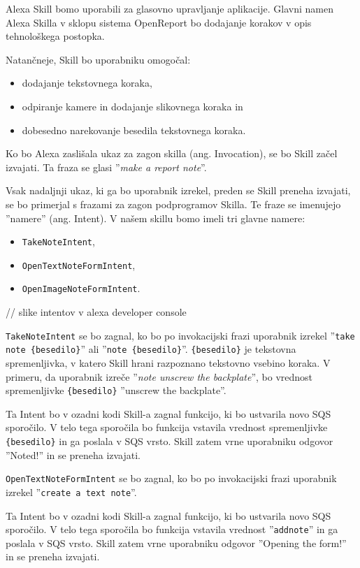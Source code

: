 \documentclass[a4paper, 12pt]{book}
\begin{document}
Alexa Skill bomo uporabili za glasovno upravljanje aplikacije.
Glavni namen Alexa Skilla v sklopu sistema OpenReport bo dodajanje korakov v opis tehnološkega postopka.

\noindent Natančneje, Skill bo uporabniku omogočal:
\begin{itemize}
	\item dodajanje tekstovnega koraka,
	\item odpiranje kamere in dodajanje slikovnega koraka in
	\item dobesedno narekovanje besedila tekstovnega koraka.
\end{itemize}

Ko bo Alexa zaslišala ukaz za zagon skilla (ang. Invocation), se bo Skill začel izvajati.
Ta fraza se glasi ''\textit{make a report note}''.

Vsak nadaljnji ukaz, ki ga bo uporabnik izrekel, preden se Skill preneha izvajati, se bo primerjal s frazami za zagon podprogramov Skilla.
Te fraze se imenujejo ''namere'' (ang. Intent).
V našem skillu bomo imeli tri glavne namere:

\begin{itemize}
	\item \texttt{TakeNoteIntent},
	\item \texttt{OpenTextNoteFormIntent},
	\item \texttt{OpenImageNoteFormIntent}.
\end{itemize}

// slike intentov v alexa developer console

\texttt{TakeNoteIntent} se bo zagnal, ko bo po invokacijski frazi uporabnik izrekel ''\texttt{take note \{besedilo\}}'' ali ''\texttt{note \{besedilo\}}''.
\texttt{\{besedilo\}} je tekstovna spremenljivka, v katero Skill hrani razpoznano tekstovno vsebino koraka.
V primeru, da uporabnik izreče ''\textit{note unscrew the backplate}'', bo vrednost spremenljivke \texttt{\{besedilo\}} ''unscrew the backplate''.

Ta Intent bo v ozadni kodi Skill-a zagnal funkcijo, ki bo ustvarila novo SQS sporočilo.
V telo tega sporočila bo funkcija vstavila vrednost spremenljivke \texttt{\{besedilo\}} in ga poslala v SQS vrsto.
Skill zatem vrne uporabniku odgovor ''Noted!'' in se preneha izvajati.

\texttt{OpenTextNoteFormIntent} se bo zagnal, ko bo po invokacijski frazi uporabnik izrekel ''\texttt{create a text note}''.

Ta Intent bo v ozadni kodi Skill-a zagnal funkcijo, ki bo ustvarila novo SQS sporočilo.
V telo tega sporočila bo funkcija vstavila vrednost ''\texttt{addnote}'' in ga poslala v SQS vrsto.
Skill zatem vrne uporabniku odgovor ''Opening the form!'' in se preneha izvajati.
\end{document}
